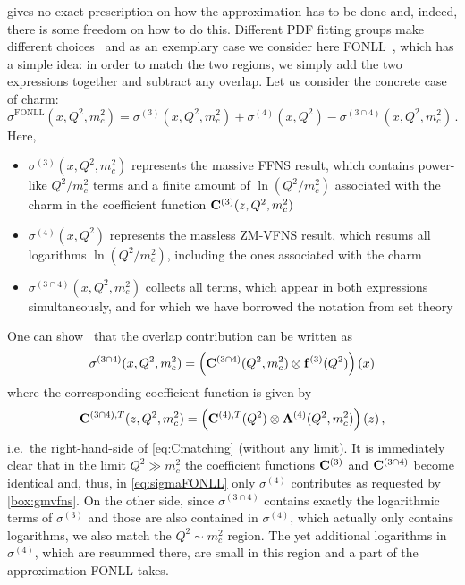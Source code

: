  gives no exact prescription on how the approximation has to be done and, indeed, there is some freedom on how to do this.
Different PDF fitting groups make different choices~\cite{Aivazis:1993pi,Thorne:1997uu,Kramer:2000hn,Tung:2001mv,Nadolsky:2009ge,Forte:2010ta,Guzzi:2011ew,Bonvini:2016fgf,Barontini:2024xgu} and as an exemplary case we consider here FONLL~\cite{Forte:2010ta,Barontini:2024xgu}, which has a simple idea:
in order to match the two regions, we simply add the two expressions together and subtract any overlap.
Let us consider the concrete case of charm:
\begin{equation}
    \sigma^\text{FONLL}(x,Q^2,m_c^2) = \sigma^{(3)}(x,Q^2,m_c^2) + \sigma^{(4)}(x,Q^2) - \sigma^{(3\cap 4)}(x,Q^2,m_c^2)\,. \label{eq:sigmaFONLL}
\end{equation}
Here,
\begin{itemize}
    \item $\sigma^{(3)}(x,Q^2,m_c^2)$ represents the massive FFNS result, which contains power-like $Q^2/m_c^2$ terms and a finite amount of $\ln(Q^2/m_c^2)$ associated with the charm in the coefficient function $\vb C^{(3)}(z,Q^2,m_c^2)$
    \item $\sigma^{(4)}(x,Q^2)$ represents the massless ZM-VFNS result, which resums all logarithms $\ln(Q^2/m_c^2)$, including the ones associated with the charm
    \item $\sigma^{(3\cap 4)}(x,Q^2,m_c^2)$ collects all terms, which appear in both expressions simultaneously, and for which we have borrowed the notation from set theory
\end{itemize}
One can show~\cite{Barontini:2024xgu} that the overlap contribution can be written as
\begin{equation}
    \sigma^{(3\cap 4)}(x,Q^2,m_c^2) = \left(\vb C^{(3\cap 4)}(Q^2,m_c^2)\otimes \vb f^{(3)}(Q^2)\right)(x)
\end{equation}
where the corresponding coefficient function is given by
\begin{equation}
    \vb C^{(3\cap 4),T}(z,Q^2,m_c^2) = \left(\vb C^{(4),T}(Q^2)\otimes \vb A^{(4)}(Q^2,m_c^2)\right)(z)\,,
\end{equation}
i.e.\ the right-hand-side of \cref{eq:Cmatching} (without any limit).
It is immediately clear that in the limit $Q^2 \gg m_c^2$ the coefficient functions $\vb C^{(3)}$ and $\vb C^{(3\cap 4)}$ become identical and, thus, in \cref{eq:sigmaFONLL} only $\sigma^{(4)}$ contributes as requested by \cref{box:gmvfns}.
On the other side, since $\sigma^{(3\cap 4)}$ contains exactly the logarithmic terms of $\sigma^{(3)}$ and those are also contained in $\sigma^{(4)}$, which actually only contains logarithms, we also match the $Q^2 \sim m_c^2$ region.
The yet additional logarithms in $\sigma^{(4)}$, which are resummed there, are small in this region and a part of the approximation FONLL takes.

